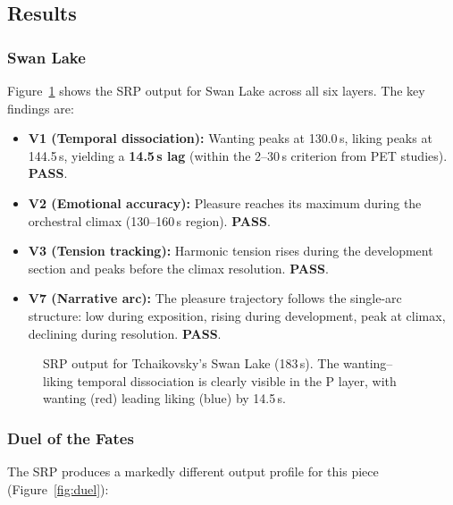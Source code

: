 \documentclass[10pt,twocolumn]{article}
\begin{document}
\subsection{Results}

\subsubsection{Swan Lake}

Figure~\ref{fig:swan_lake} shows the SRP output for Swan Lake across all six layers. The key findings are:

\begin{itemize}
\item \textbf{V1 (Temporal dissociation):} Wanting peaks at 130.0\,s, liking peaks at 144.5\,s, yielding a \textbf{14.5\,s lag} (within the 2--30\,s criterion from PET studies). \textbf{PASS}.
\item \textbf{V2 (Emotional accuracy):} Pleasure reaches its maximum during the orchestral climax (130--160\,s region). \textbf{PASS}.
\item \textbf{V3 (Tension tracking):} Harmonic tension rises during the development section and peaks before the climax resolution. \textbf{PASS}.
\item \textbf{V7 (Narrative arc):} The pleasure trajectory follows the single-arc structure: low during exposition, rising during development, peak at climax, declining during resolution. \textbf{PASS}.
\end{itemize}

\begin{figure}[t]
\centering
{}
\caption{SRP output for Tchaikovsky's Swan Lake (183\,s). The wanting--liking temporal dissociation is clearly visible in the P layer, with wanting (red) leading liking (blue) by 14.5\,s.}
\label{fig:swan_lake}
\end{figure}

\subsubsection{Duel of the Fates}

The SRP produces a markedly different output profile for this piece (Figure~\ref{fig:duel}):
\end{document}

